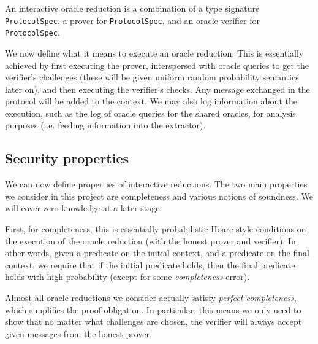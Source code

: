 \begin{definition}
    \label{def:interactive_oracle_reduction}
    An interactive oracle reduction is a combination of a type signature \verb|ProtocolSpec|, a prover for \verb|ProtocolSpec|, and an oracle verifier for \verb|ProtocolSpec|.
\end{definition}

We now define what it means to execute an oracle reduction. This is essentially achieved by first
executing the prover, interspersed with oracle queries to get the verifier's challenges (these will
be given uniform random probability semantics later on), and then executing the verifier's checks.
Any message exchanged in the protocol will be added to the context. We may also log information
about the execution, such as the log of oracle queries for the shared oracles, for analysis purposes
(i.e. feeding information into the extractor).

\begin{definition}
    \label{def:oracle_reduction_execution}
\end{definition}

\subsection{Security properties}

We can now define properties of interactive reductions. The two main properties we consider in this
project are completeness and various notions of soundness. We will cover zero-knowledge at a later
stage.

First, for completeness, this is essentially probabilistic Hoare-style conditions on the execution
of the oracle reduction (with the honest prover and verifier). In other words, given a predicate on
the initial context, and a predicate on the final context, we require that if the initial predicate
holds, then the final predicate holds with high probability (except for some \emph{completeness}
error).

\begin{definition}[Completeness]
    \label{def:completeness}
\end{definition}

Almost all oracle reductions we consider actually satisfy \emph{perfect completeness}, which
simplifies the proof obligation. In particular, this means we only need to show that no matter what challenges are chosen, the verifier will always accept given messages from the honest prover.

